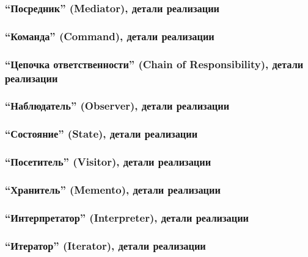 \documentclass[xetex,mathserif,serif]{beamer}
\begin{document}
	\begin{frame}
		\frametitle{``Посредник'' (Mediator), детали реализации}
	\end{frame}

	\begin{frame}
		\frametitle{``Команда'' (Command), детали реализации}
	\end{frame}

	\begin{frame}
		\frametitle{``Цепочка ответственности'' (Chain of Responsibility), детали реализации}
	\end{frame}

	\begin{frame}
		\frametitle{``Наблюдатель'' (Observer), детали реализации}
	\end{frame}

	\begin{frame}
		\frametitle{``Состояние'' (State), детали реализации}
	\end{frame}

	\begin{frame}
		\frametitle{``Посетитель'' (Visitor), детали реализации}
	\end{frame}

	\begin{frame}
		\frametitle{``Хранитель'' (Memento), детали реализации}
	\end{frame}

	\begin{frame}
		\frametitle{``Интерпретатор'' (Interpreter), детали реализации}
	\end{frame}

	\begin{frame}
		\frametitle{``Итератор'' (Iterator), детали реализации}
	\end{frame}

\end{document}
